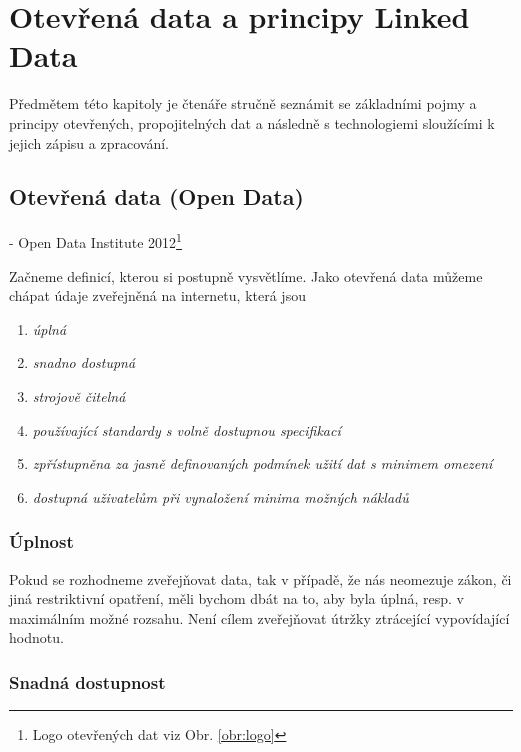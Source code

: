 \chapter{Otevřená data a principy Linked Data}
\label{sec:kap2}

Předmětem této kapitoly je čtenáře stručně seznámit se základními pojmy a principy otevřených, propojitelných dat a následně s technologiemi sloužícími k jejich zápisu a zpracování.

\section[Otevřená data (Open Data)]{Otevřená data (Open Data)\cite{howtoopendata, odgov_s}}

\textit{} - Open Data Institute 2012\footnote{Logo otevřených dat viz Obr. \ref{obr:logo}}
\newline

Začneme definicí, kterou si postupně vysvětlíme. Jako otevřená data můžeme chápat údaje zveřejněná na internetu, která jsou 

\begin{enumerate}
\item \textit{úplná}
\item \textit{snadno dostupná}
\item \textit{strojově čitelná}
\item \textit{používající standardy s volně dostupnou specifikací}
\item \textit{zpřístupněna za jasně definovaných podmínek užití dat s minimem omezení}
\item \textit{dostupná uživatelům při vynaložení minima možných nákladů}\cite{mv}
\end{enumerate}

\subsection*{Úplnost}

Pokud se rozhodneme zveřejňovat data, tak v případě, že nás neomezuje zákon, či jiná restriktivní opatření, měli bychom dbát na to, aby byla úplná, resp. v maximálním možné rozsahu. Není cílem zveřejňovat útržky ztrácející vypovídající hodnotu.

\subsection*{Snadná dostupnost}

